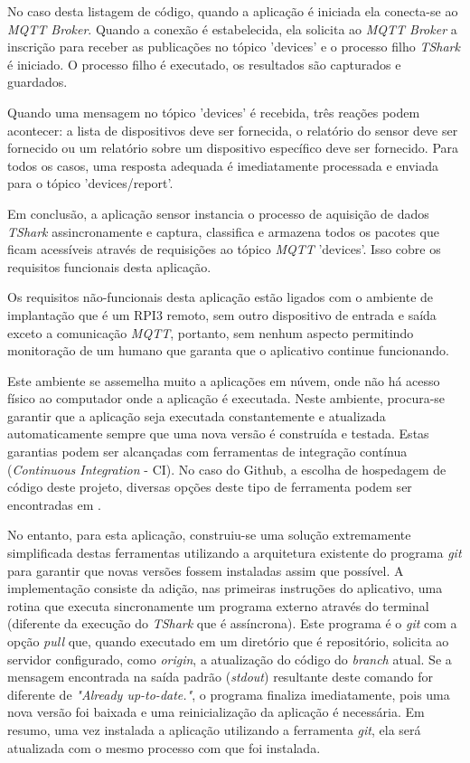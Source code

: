 No caso desta listagem de código, quando a aplicação é iniciada ela conecta-se ao \emph{MQTT Broker}.
Quando a conexão é estabelecida, ela solicita ao \emph{MQTT Broker} a inscrição
para receber as publicações no tópico 'devices' e o processo filho \emph{TShark}
é iniciado. O processo filho é executado, os resultados são capturados e
guardados.

Quando uma mensagem no tópico 'devices' é recebida, três reações podem acontecer:
a lista de dispositivos deve ser fornecida, o relatório do sensor deve ser
fornecido ou um relatório sobre um dispositivo específico deve ser fornecido.
Para todos os casos, uma resposta adequada é imediatamente processada e enviada
para o tópico 'devices/report'.

Em conclusão, a aplicação sensor instancia o processo de aquisição de dados
\emph{TShark} assincronamente e captura, classifica e armazena todos os pacotes
que ficam acessíveis através de requisições ao tópico \emph{MQTT} 'devices'.
Isso cobre os requisitos funcionais desta aplicação.

Os requisitos não-funcionais desta aplicação estão ligados com o ambiente de
implantação que é um RPI3 remoto, sem outro dispositivo de entrada e saída
exceto a comunicação \emph{MQTT}, portanto, sem nenhum aspecto permitindo
monitoração de um humano que garanta que o aplicativo continue funcionando.

Este ambiente se assemelha muito a aplicações em núvem, onde não há acesso
físico ao computador onde a aplicação é executada. Neste ambiente, procura-se
garantir que a aplicação seja executada constantemente e atualizada
automaticamente sempre que uma nova versão é construída e testada. Estas
garantias podem ser alcançadas com ferramentas de integração contínua
(\emph{Continuous Integration} - CI). No caso do Github, a escolha de hospedagem
de código deste projeto, diversas opções deste tipo de ferramenta podem ser
encontradas em .

No entanto, para esta aplicação, construiu-se uma solução extremamente
simplificada destas ferramentas utilizando a arquitetura existente do programa
\emph{git} para garantir que novas versões fossem instaladas assim que possível.
A implementação consiste da adição, nas primeiras instruções do aplicativo,
uma rotina que executa sincronamente um programa externo através do terminal
(diferente da execução do \emph{TShark} que é assíncrona). Este programa é
o \emph{git} com a opção \emph{pull} que, quando executado em um diretório que
é repositório, solicita ao servidor configurado, como \emph{origin}, a atualização
do código do \emph{branch} atual. Se a mensagem encontrada na saída padrão
(\emph{stdout}) resultante deste comando for diferente de
\emph{"Already up-to-date."}, o programa finaliza imediatamente, pois uma nova
versão foi baixada e uma reinicialização da aplicação é necessária.
Em resumo, uma vez instalada a aplicação utilizando a ferramenta \emph{git}, ela
será atualizada com o mesmo processo com que foi instalada.

